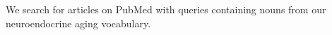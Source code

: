 We search for articles on PubMed with queries containing nouns from our
neuroendocrine aging vocabulary.

